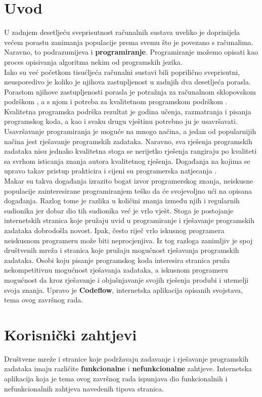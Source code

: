 \documentclass[times, utf8, zavrsni, numeric]{fer}
\begin{document}
	\chapter{Uvod}
	U zadnjem desetljeću sveprisutnost računalnih sustava uveliko je doprinijela većem porastu zanimanja populacije prema svemu što je povezano s računalima.  Naravno, to podrazumijeva i  \textbf{programiranje}. Programiranje možemo opisati kao proces opisivanja algoritma nekim od programskih jezika.\\
	Iako su već početkom tisućljeća računalni sustavi bili poprilično sveprisutni, neusporedivo je koliko je njihova zastupljenost u zadnjih dva desetljeća porasla. Porastom njihove zastupljenosti porasla je potražnja za računalnom sklopovskom podrškom , a s njom i potreba za kvalitetnom programskom podrškom . Kvalitetna programska podrška rezultat je godina učenja, razmatranja i pisanja programskog koda, a kao i svaku drugu vještinu potrebno ju je usavršavati. Usavršavanje programiranja je moguće na mnogo načina, a jedan od popularnijih načina jest rješavanje programskih zadataka. Naravno, sva rješenja programskih zadataka nisu jednako kvalitetna stoga se nerijetko rješenja rangiraju po kvaliteti sa svrhom isticanja znanja autora kvalitetnog rješenja. Događanja na kojima se upravo takav pristup prakticira i cijeni su programerska natjecanja .\\
	Makar su takva događanja izrazito bogat izvor programerskog znanja, neiskusne populacije zainteresirane programiranjem teško da će svojevoljno ući na opisana događanja. Razlog tome je razlika u količini znanja između njih i regularnih sudionika jer dobar dio tih sudionika već je vrlo vješt. Stoga je postojanje internetskih stranica koje pružaju uvid u programiranje i rješavanje programskih zadataka dobrodošla novost. Ipak, često riječ vrlo iskusnog programera neiskusnom programeru može biti neprocjenjiva. Iz tog razloga zanimljiv je spoj društvenih mreža  i stranica koje pružaju mogućnost rješavanja programskih zadataka. Osobi koju pisanje programskog koda interesira stranica pruža nekompetitivnu mogućnost rješavanja zadataka, a iskusnom programeru mogućnost da kroz rješavanje i objašnjavanje svojih rješenja produbi i utemelji svoja znanja. Upravo je \textbf{Codeflow}, internetska aplikacija opisanih svojstava, tema ovog završnog rada.
	
	\chapter{Korisnički zahtjevi}
	\label{cha:zahtjevi}
	Društvene mreže i stranice koje podržavaju zadavanje i rješavanje programskih zadataka imaju različite \textbf{funkcionalne} i \textbf{nefunkcionalne} zahtjeve. Internetska aplikacija koja je tema ovog završnog rada ispunjava dio funkcionalnih i nefunkcionalnih zahtjeva navedenih tipova stranica.
	
\end{document}

